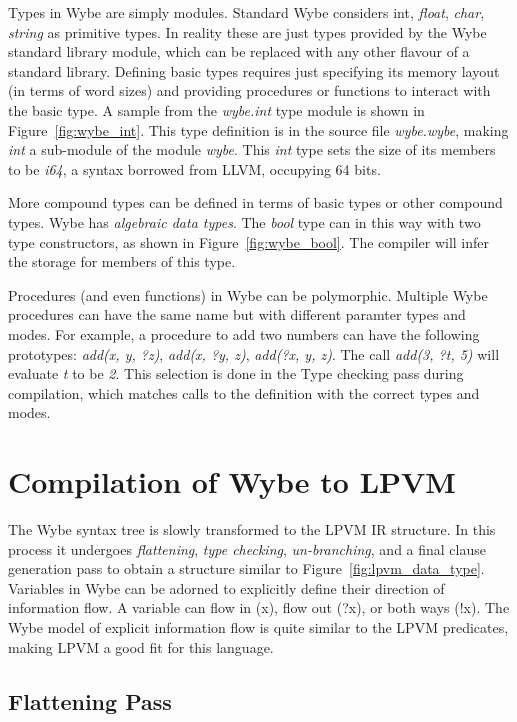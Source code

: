 Types in Wybe are simply modules. Standard Wybe considers {int},
\textit{float}, \textit{char}, \textit{string} as primitive types. In reality
these are just types provided by the Wybe standard library module, which can be
replaced with any other flavour of a standard library. Defining basic types
requires just specifying its memory layout (in terms of word sizes) and
providing procedures or functions to interact with the basic type. A sample
from the \textit{wybe.int} type module is shown in Figure~\ref{fig:wybe_int}. This
type definition is in the source file \textit{wybe.wybe}, making \textit{int} a sub-module
of the module \textit{wybe}. This \textit{int} type sets the size of its
members to be \textit{i64}, a syntax borrowed from LLVM, occupying 64 bits. 

More compound types can be defined in terms of basic types or other compound
types. Wybe has \textit{algebraic data types}. The \textit{bool} type can in
this way with two type constructors, as shown in
Figure~\ref{fig:wybe_bool}. The compiler will infer the storage for members of
this type. 


Procedures (and even functions) in Wybe can be polymorphic. Multiple Wybe
procedures can have the same name but with different paramter types and
modes. For example, a procedure to add two numbers can have the following
prototypes: \textit{add(x, y, ?z)}, \textit{add(x, ?y, z)}, \textit{add(?x, y,
  z)}. The call \textit{add(3, ?t, 5)} will evaluate \textit{t} to be
\textit{2}. This selection is done in the Type checking pass during
compilation, which matches calls to the definition with the correct types and
modes.



\section{Compilation of Wybe to LPVM}

The Wybe syntax tree is slowly transformed to the LPVM IR structure. In this
process it undergoes \textit{flattening}, \textit{type checking},
\textit{un-branching}, and a final clause generation pass to obtain a structure
similar to Figure~\ref{fig:lpvm_data_type}. Variables in Wybe can be adorned to
explicitly define their direction of information flow. A variable can flow in
(x), flow out (?x), or both ways (!x). The Wybe model of explicit information
flow is quite similar to the LPVM predicates, making LPVM a good fit for this
language. 

\subsection{Flattening Pass}


